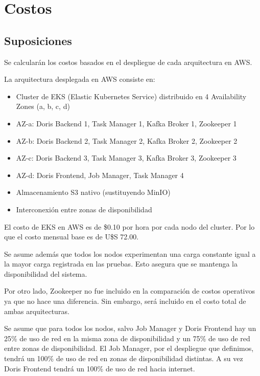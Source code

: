 \section{Costos}

\subsection{Suposiciones}
Se calcularán los costos basados en el despliegue de cada arquitectura en AWS.

La arquitectura desplegada en AWS consiste en:

\begin{itemize}
    \item Cluster de EKS (Elastic Kubernetes Service) distribuido en 4 Availability Zones (a, b, c, d)
    \item AZ-a: Doris Backend 1, Task Manager 1, Kafka Broker 1, Zookeeper 1
    \item AZ-b: Doris Backend 2, Task Manager 2, Kafka Broker 2, Zookeeper 2
    \item AZ-c: Doris Backend 3, Task Manager 3, Kafka Broker 3, Zookeeper 3
    \item AZ-d: Doris Frontend, Job Manager, Task Manager 4
    \item Almacenamiento S3 nativo (sustituyendo MinIO)
    \item Interconexión entre zonas de disponibilidad
\end{itemize}

El costo de EKS en AWS es de \$0.10 por hora por cada nodo del cluster.
Por lo que el costo mensual base es de U\$S 72.00. \newline

Se asume además que todos los nodos experimentan una carga constante igual a la mayor carga registrada en las pruebas. 
Esto asegura que se mantenga la disponibilidad del sistema.\newline

Por otro lado, Zookeeper no fue incluido en la comparación de costos operativos ya que no hace una diferencia. 
Sin embargo, será incluido en el costo total de ambas arquitecturas. \newline

Se asume que para todos los nodos, salvo Job Manager y Doris Frontend hay un 25\% de uso de red en la misma zona de disponibilidad y un 75\% de uso de red entre zonas de disponibilidad.
El Job Manager, por el despliegue que definimos, tendrá un 100\% de uso de red en zonas de disponibilidad distintas.
A su vez Doris Frontend tendrá un 100\% de uso de red hacia internet. \newline



